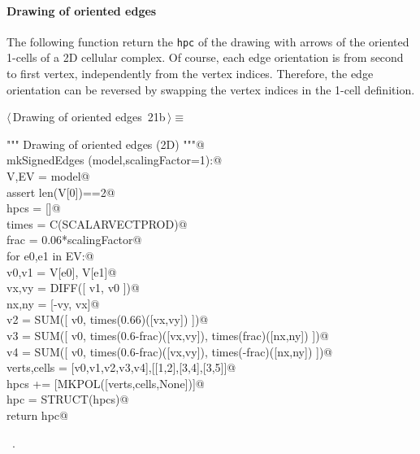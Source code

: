 \documentclass[11pt,oneside]{article}    %
\begin{document}
\paragraph{Drawing of oriented edges}
The following function return the \texttt{hpc} of the drawing with arrows of the oriented 1-cells of a 2D cellular complex. Of course, each edge orientation is from second to first vertex, independently from the vertex indices. Therefore, the edge orientation can be reversed by swapping the vertex indices in the 1-cell definition. 
\begin{flushleft} \small \label{scrap34}
\protect{}$\langle\,$Drawing of oriented edges\nobreak\ {\footnotesize 21b}$\,\rangle\equiv$
\vspace{-1ex}
\begin{list}{}{} \item
\mbox{}\verb@""" Drawing of oriented edges (2D) """@\\
\mbox{}\verb@def mkSignedEdges (model,scalingFactor=1):@\\
\mbox{}\verb@    V,EV = model@\\
\mbox{}\verb@    assert len(V[0])==2@\\
\mbox{}\verb@    hpcs = []@\\
\mbox{}\verb@    times = C(SCALARVECTPROD)@\\
\mbox{}\verb@    frac = 0.06*scalingFactor@\\
\mbox{}\verb@    for e0,e1 in EV:@\\
\mbox{}\verb@        v0,v1 = V[e0], V[e1]@\\
\mbox{}\verb@        vx,vy = DIFF([ v1, v0 ])@\\
\mbox{}\verb@        nx,ny = [-vy, vx]@\\
\mbox{}\verb@        v2 = SUM([ v0, times(0.66)([vx,vy]) ])@\\
\mbox{}\verb@        v3 = SUM([ v0, times(0.6-frac)([vx,vy]), times(frac)([nx,ny]) ])@\\
\mbox{}\verb@        v4 = SUM([ v0, times(0.6-frac)([vx,vy]), times(-frac)([nx,ny]) ])@\\
\mbox{}\verb@        verts,cells = [v0,v1,v2,v3,v4],[[1,2],[3,4],[3,5]]@\\
\mbox{}\verb@        hpcs += [MKPOL([verts,cells,None])]@\\
\mbox{}\verb@    hpc = STRUCT(hpcs)@\\
\mbox{}\verb@    return hpc@\\
\mbox{}\verb@@{\NWsep}
\end{list}
\vspace{-1ex}
\footnotesize\addtolength{\baselineskip}{-1ex}
\begin{list}{}{\setlength{\itemsep}{-\parsep}\setlength{\itemindent}{-\leftmargin}}
\item \NWtxtMacroRefIn\ .
\end{list}
\end{flushleft}
\end{document}
